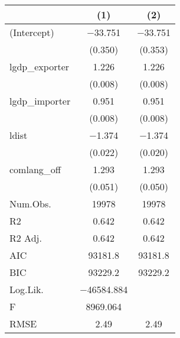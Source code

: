\begin{table}
\centering
\begin{tabular}[t]{lcc}
\toprule
  & (1) & (2)\\
\midrule
(Intercept) & \num{-33.751} & \num{-33.751}\\
 & (\num{0.350}) & (\num{0.353})\\
lgdp\_exporter & \num{1.226} & \num{1.226}\\
 & (\num{0.008}) & \vphantom{1} (\num{0.008})\\
lgdp\_importer & \num{0.951} & \num{0.951}\\
 & (\num{0.008}) & (\num{0.008})\\
ldist & \num{-1.374} & \num{-1.374}\\
 & (\num{0.022}) & (\num{0.020})\\
comlang\_off & \num{1.293} & \num{1.293}\\
 & (\num{0.051}) & (\num{0.050})\\
\midrule
Num.Obs. & \num{19978} & \num{19978}\\
R2 & \num{0.642} & \num{0.642}\\
R2 Adj. & \num{0.642} & \num{0.642}\\
AIC & \num{93181.8} & \num{93181.8}\\
BIC & \num{93229.2} & \num{93229.2}\\
Log.Lik. & \num{-46584.884} & \\
F & \num{8969.064} & \\
RMSE & \num{2.49} & \num{2.49}\\
\bottomrule
\end{tabular}
\end{table}
